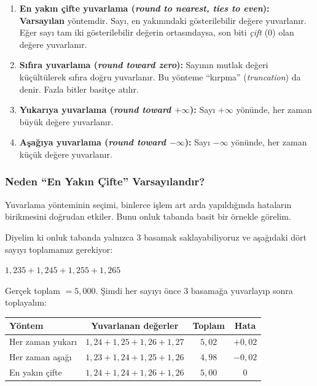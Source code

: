 \begin{enumerate}
\item \textbf{En yakın çifte yuvarlama (\emph{round to nearest, ties to even}):} \textbf{Varsayılan} yöntemdir. Sayı, en yakınındaki gösterilebilir değere yuvarlanır. Eğer sayı tam iki gösterilebilir değerin ortasındaysa, son biti \emph{çift} (0) olan değere yuvarlanır.

\item \textbf{Sıfıra yuvarlama (\emph{round toward zero}):} Sayının mutlak değeri küçültülerek sıfıra doğru yuvarlanır. Bu yönteme ``kırpma'' (\emph{truncation}) da denir. Fazla bitler basitçe atılır.

\item \textbf{Yukarıya yuvarlama (\emph{round toward $+\infty$}):} Sayı $+\infty$ yönünde, her zaman büyük değere yuvarlanır.

\item \textbf{Aşağıya yuvarlama (\emph{round toward $-\infty$}):} Sayı $-\infty$ yönünde, her zaman küçük değere yuvarlanır.
\end{enumerate}

\subsubsection{Neden ``En Yakın Çifte'' Varsayılandır?}

Yuvarlama yönteminin seçimi, binlerce işlem art arda yapıldığında hataların birikmesini doğrudan etkiler. Bunu onluk tabanda basit bir örnekle görelim.

Diyelim ki onluk tabanda yalnızca 3 basamak saklayabiliyoruz ve aşağıdaki dört sayıyı toplamamız gerekiyor:

\begin{center}
$1{,}235 + 1{,}245 + 1{,}255 + 1{,}265$
\end{center}

Gerçek toplam $= 5{,}000$. Şimdi her sayıyı önce 3 basamağa yuvarlayıp sonra toplayalım:

\begin{center}
\small
\begin{tabular}{l c c c}
\toprule
\textbf{Yöntem} & \textbf{Yuvarlanan değerler} & \textbf{Toplam} & \textbf{Hata} \\
\midrule
Her zaman yukarı & $1{,}24 + 1{,}25 + 1{,}26 + 1{,}27$ & $5{,}02$ & $+0{,}02$ \\
Her zaman aşağı & $1{,}23 + 1{,}24 + 1{,}25 + 1{,}26$ & $4{,}98$ & $-0{,}02$ \\
En yakın çifte & $1{,}24 + 1{,}24 + 1{,}26 + 1{,}26$ & $5{,}00$ & $0$ \\
\bottomrule
\end{tabular}
\end{center}

